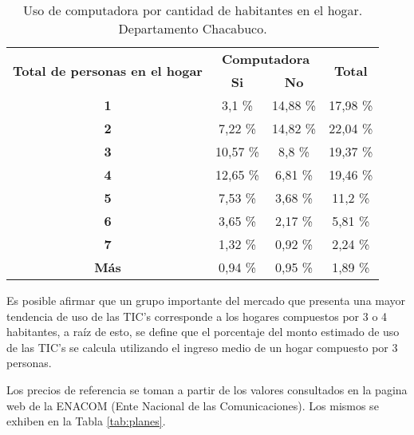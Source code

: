 %
%
%
%
%
%
%
%
%
%
%
%
%
%
%
%
%
%
%
\begin{table}[H]
  \centering
  \tiny
    \begin{tabular}{|c|c|c|c|}
    \hline
    \multirow{2}[4]{*}{\textcolor[rgb]{ .122,  .286,  .49}{\textbf{Total de personas en el hogar}}} &
      \multicolumn{2}{c|}{\textcolor[rgb]{ .122,  .286,  .49}{\textbf{Computadora}}} &
      \multicolumn{1}{c|}{\multirow{2}[4]{*}{\textcolor[rgb]{ .122,  .286,  .49}{\textbf{Total}}}}
      \bigstrut\\
\cline{2-3}     &
      \textcolor[rgb]{ .122,  .286,  .49}{\textbf{Si}} &
      \textcolor[rgb]{ .122,  .286,  .49}{\textbf{No}} &
      
      \bigstrut\\
    \hline
    \textbf{1} &
      3,1 \% &
      14,88 \% &
      17,98 \%
      \bigstrut\\
    \hline
    \textbf{2} &
      7,22 \% &
      14,82 \% &
      22,04 \%
      \bigstrut\\
    \hline
    \textbf{3} &
      10,57 \% &
      8,8 \% &
      19,37 \%
      \bigstrut\\
    \hline
    \textbf{4} &
      12,65 \% &
      6,81 \% &
      19,46 \%
      \bigstrut\\
    \hline
    \textbf{5} &
      7,53 \% &
      3,68 \% &
      11,2 \%
      \bigstrut\\
    \hline
    \textbf{6} &
      3,65 \% &
      2,17 \% &
      5,81 \%
      \bigstrut\\
    \hline
    \textbf{7} &
      1,32 \% &
      0,92 \% &
      2,24 \%
      \bigstrut\\
    \hline
    \textbf{Más} &
      0,94 \% &
      0,95 \% &
      1,89 \%
      \bigstrut\\
    \hline
    \end{tabular}%
  \caption{Uso de computadora por cantidad de habitantes en el hogar. Departamento Chacabuco.}
  \label{tab:computadora}%
\end{table}%

%
%
%
%
%
Es posible afirmar que un grupo importante del mercado que presenta una mayor tendencia de uso de las TIC's corresponde a los hogares compuestos por 3 o 4 habitantes, a raíz de esto, se define que el porcentaje del monto estimado de uso de las TIC's se calcula utilizando el ingreso medio de un hogar compuesto por 3 personas.

%
Los precios de referencia se toman a partir de los valores consultados en la pagina web de la ENACOM (Ente Nacional de las Comunicaciones).
Los mismos se exhiben en la Tabla \ref{tab:planes}.










